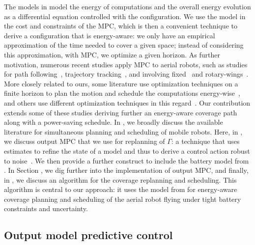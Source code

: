 The models in  model the energy of computations and the overall energy evolution as a differential equation controlled with the configuration. We use the model in the cost and constraints of the MPC, which is then a convenient technique to derive a configuration that is energy-aware: we only have an empirical approximation of the time needed to cover a given space; instead of considering this approximation, with MPC, we optimize a given horizon. As further motivation, numerous recent studies apply MPC to aerial robots, such as studies for path following~\citep{gavilan2015iterative}, trajectory tracking~\citep{torrente2021data}, and involving fixed~\citep{kang2009linear,stastny2018nonlinear,chao2011collision,cavanini2021model} and rotary-wings~\citep{kostadinov2020online,song2020learning,bicego2020nonlinear}. More closely related to ours, some literature use optimization techniques on a finite horizon to plan the motion and schedule the computations energy-wise~\citep{zhang2007low,ondruska2015scheduled}, and others use different optimization techniques in this regard~\citep{lahijanian2018resource,brateman2006energy}. Our contribution extends some of these studies deriving further an energy-aware coverage path along with a power-saving schedule. In , we broadly discuss the available literature for simultaneous planning and scheduling of mobile robots. Here, in , we discuss output MPC that we use for replanning of $\Gamma$: a technique that uses estimates to refine the state of a model and thus to derive a control action robust to noise~\citep{rawlings2017model}. We then provide a further construct to include the battery model from . In Section , we dig further into the implementation of output MPC, and finally, in , we discuss an algorithm for the coverage replanning and scheduling. This algorithm is central to our approach: it uses the model from  for energy-aware coverage planning and scheduling of the aerial robot flying under tight battery constraints and uncertainty.

\subsection{Output model predictive control}
\label{sec:output-mpc}

